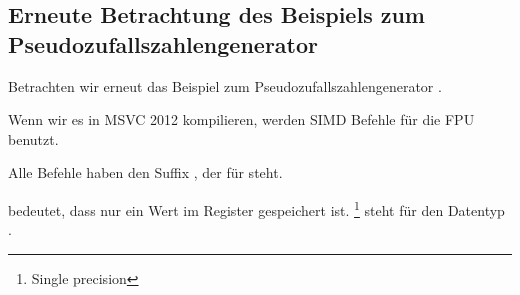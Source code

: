 \subsection{Erneute Betrachtung des Beispiels zum Pseudozufallszahlengenerator}
\label{FPU_PRNG_SIMD}

Betrachten wir erneut das Beispiel zum Pseudozufallszahlengenerator .

Wenn wir es in MSVC 2012 kompilieren, werden SIMD Befehle für die FPU benutzt.



Alle Befehle haben den Suffix , der für  steht.

 bedeutet, dass nur ein Wert im Register gespeichert ist.
\footnote{Single precision} steht für den Datentyp \Tfloat.

